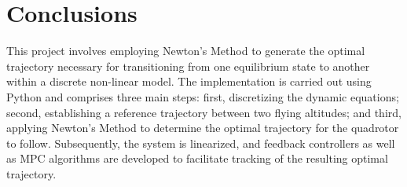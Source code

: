 \documentclass[a4paper,11pt,oneside]{book}
\begin{document}
\chapter*{Conclusions}
This project involves employing Newton's Method to generate the optimal trajectory necessary for transitioning from one equilibrium state to another within a discrete non-linear model. The implementation is carried out using Python and comprises three main steps: first, discretizing the dynamic equations; second, establishing a reference trajectory between two flying altitudes; and third, applying Newton's Method to determine the optimal trajectory for the quadrotor to follow. Subsequently, the system is linearized, and feedback controllers as well as MPC algorithms are developed to facilitate tracking of the resulting optimal trajectory.

{}



\end{document}
